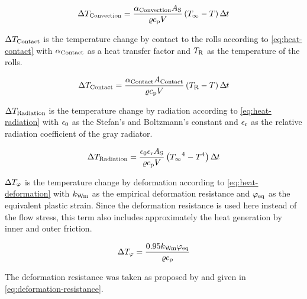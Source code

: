 \begin{equation}
    {\Delta{T}_\mathrm{Convection}} = \frac{{{\alpha}_\mathrm{Convection}} {{A}_\mathrm{S}}}{{\varrho}{c_\mathrm{p}}{V}} \left( {{T}_\infty} - {T} \right) {\Delta\mspace{-1mu}t}
    \label{eq:heat-convection}
\end{equation}

\noindent${\Delta{T}_\mathrm{Contact}}$ is the temperature change by contact to the rolls according to \autoref{eq:heat-contact} with ${{\alpha}_\mathrm{Contact}}$ as a heat transfer factor and ${{T}_\mathrm{R}}$ as the temperature of the rolls.

\begin{equation}
    {\Delta{T}_\mathrm{Contact}} = \frac{{{\alpha}_\mathrm{Contact}} {{A}_\mathrm{Contact}}}{{\varrho}{c_\mathrm{p}}{V}} \left( {{T}_\mathrm{R}} - {T} \right) {\Delta\mspace{-1mu}t}
    \label{eq:heat-contact}
\end{equation}

\noindent${\Delta{T}_\mathrm{Radiation}}$ is the temperature change by radiation according to \autoref{eq:heat-radiation} with ${\epsilon_0}$ as the Stefan's and Boltzmann's constant and ${\epsilon_\mathrm{r}}$ as the relative radiation coefficient of the gray radiator.

\begin{equation}
    {\Delta{T}_\mathrm{Radiation}} = \frac{{\epsilon_0} {\epsilon_\mathrm{r}} {{A}_\mathrm{S}}}{{\varrho}{c_\mathrm{p}}{V}} \left( {{T}_\infty}^4 - {T}^4 \right) {\Delta\mspace{-1mu}t}
    \label{eq:heat-radiation}
\end{equation}

\noindent$\Delta{T}_{{\varphi}}$ is the temperature change by deformation according to \autoref{eq:heat-deformation} with ${k_\mathrm{Wm}}$ as the empirical deformation resistance and ${{{\varphi}}_\mathrm{eq}}$ as the equivalent plastic strain.
Since the deformation resistance is used here instead of the flow stress, this term also includes approximately the heat generation by inner and outer friction.

\begin{equation}
    \Delta{T}_{{\varphi}} = \frac{\num{0.95} {k_\mathrm{Wm}} {{{\varphi}}_\mathrm{eq}}}{{\varrho}{c_\mathrm{p}}}
    \label{eq:heat-deformation}
\end{equation}

The deformation resistance was taken as proposed by \textcite{Hensel1978} and given in \autoref{eq:deformation-resistance}.

